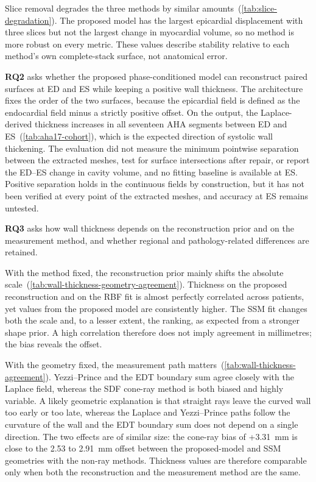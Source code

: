 Slice removal degrades the three methods by similar amounts~(\cref{tab:slice-degradation}). The proposed model has the largest epicardial
displacement with three slices but not the largest change in myocardial volume,
so no method is more robust on every metric. These values describe stability
relative to each method's own complete-stack surface, not anatomical error.

\textbf{RQ2} asks whether the proposed phase-conditioned model can reconstruct paired
surfaces at ED and ES while keeping a positive wall thickness. The architecture
fixes the order of the two surfaces, because the epicardial field is defined as
the endocardial field minus a strictly positive offset. On the output, the
Laplace-derived thickness increases in all seventeen AHA segments between ED and
ES~(\cref{tab:aha17-cohort}), which is the expected direction of systolic wall
thickening. The evaluation did not measure the minimum pointwise separation
between the extracted meshes, test for surface intersections after repair, or
report the ED--ES change in cavity volume, and no fitting baseline is available
at ES. Positive separation holds in the continuous fields by
construction, but it has not been verified at every point of the extracted
meshes, and accuracy at ES remains untested.

\textbf{RQ3} asks how wall thickness depends on the reconstruction prior and on
the measurement method, and whether regional and pathology-related differences
are retained.

With the method fixed, the reconstruction prior mainly shifts the absolute
scale~(\cref{tab:wall-thickness-geometry-agreement}). Thickness on the proposed reconstruction and
on the RBF fit is almost perfectly correlated across patients, yet values from the proposed model are
consistently higher. The SSM fit changes both the scale and, to a lesser
extent, the ranking, as expected from a stronger shape prior. A high correlation
therefore does not imply agreement in millimetres; the bias reveals the
offset.

With the geometry fixed, the measurement path matters~(\cref{tab:wall-thickness-agreement}). Yezzi--Prince and the EDT boundary sum
agree closely with the Laplace field, whereas the SDF cone-ray method is both
biased and highly variable. A likely geometric explanation is that straight
rays leave the curved wall too early or too late, whereas
the Laplace and Yezzi--Prince paths follow the curvature of the wall and the
EDT boundary sum does not depend on a single direction. The two effects are of
similar size: the cone-ray bias of +3.31~mm is close to the 2.53 to
2.91~mm offset between the proposed-model and SSM geometries with the non-ray methods.
Thickness values are therefore comparable only when both the reconstruction and
the measurement method are the same.

